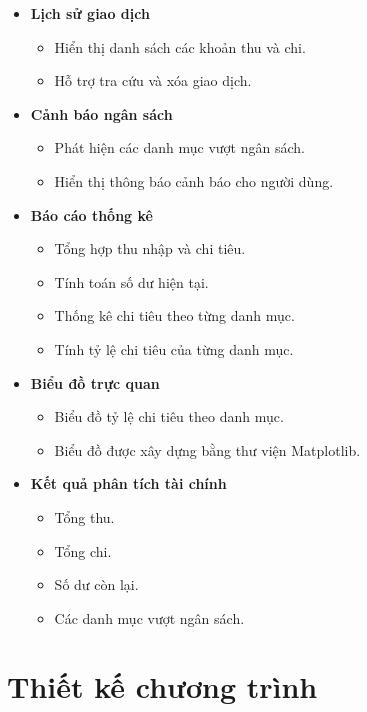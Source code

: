 \documentclass[12pt,letterpaper]{article}
\begin{document}
\begin{itemize}
\item \textbf{Lịch sử giao dịch}
\begin{itemize}
\item Hiển thị danh sách các khoản thu và chi.
\item Hỗ trợ tra cứu và xóa giao dịch.
\end{itemize}
\item \textbf{Cảnh báo ngân sách}
\begin{itemize}
    \item Phát hiện các danh mục vượt ngân sách.
    \item Hiển thị thông báo cảnh báo cho người dùng.
\end{itemize}

\item \textbf{Báo cáo thống kê}
\begin{itemize}
    \item Tổng hợp thu nhập và chi tiêu.
    \item Tính toán số dư hiện tại.
    \item Thống kê chi tiêu theo từng danh mục.
    \item Tính tỷ lệ chi tiêu của từng danh mục.
\end{itemize}

\item \textbf{Biểu đồ trực quan}
\begin{itemize}
    \item Biểu đồ tỷ lệ chi tiêu theo danh mục.
    \item Biểu đồ được xây dựng bằng thư viện Matplotlib.
\end{itemize}

\item \textbf{Kết quả phân tích tài chính}
\begin{itemize}
    \item Tổng thu.
    \item Tổng chi.
    \item Số dư còn lại.
    \item Các danh mục vượt ngân sách.
\end{itemize}
\end{itemize}
\newpage
\section{Thiết kế chương trình}
\end{document}
